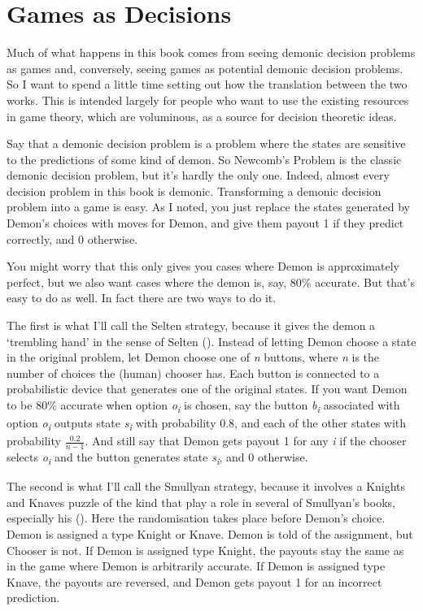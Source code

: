 \documentclass[
  12pt,
  letterpaper,
  DIV=11,
  numbers=noendperiod]{scrreprt}
\begin{document}
\cleardoublepage
{}
{}
\appendix

\chapter{Games as Decisions}\label{sec-gad}

Much of what happens in this book comes from seeing demonic decision
problems as games and, conversely, seeing games as potential demonic
decision problems. So I want to spend a little time setting out how the
translation between the two works. This is intended largely for people
who want to use the existing resources in game theory, which are
voluminous, as a source for decision theoretic ideas.

Say that a demonic decision problem is a problem where the states are
sensitive to the predictions of some kind of demon. So Newcomb's Problem
is the classic demonic decision problem, but it's hardly the only one.
Indeed, almost every decision problem in this book is demonic.
Transforming a demonic decision problem into a game is easy. As I noted,
you just replace the states generated by Demon's choices with moves for
Demon, and give them payout 1 if they predict correctly, and 0
otherwise.

You might worry that this only gives you cases where Demon is
approximately perfect, but we also want cases where the demon is, say,
80\% accurate. But that's easy to do as well. In fact there are two ways
to do it.

The first is what I'll call the Selten strategy, because it gives the
demon a `trembling hand' in the sense of Selten
(). Instead of letting Demon choose a
state in the original problem, let Demon choose one of \emph{n} buttons,
where \emph{n} is the number of choices the (human) chooser has. Each
button is connected to a probabilistic device that generates one of the
original states. If you want Demon to be 80\% accurate when option
\emph{o\textsubscript{i}} is chosen, say the button
\emph{b\textsubscript{i}} associated with option
\emph{o\textsubscript{i}} outputs state \emph{s\textsubscript{i}} with
probability 0.8, and each of the other states with probability
\(\frac{0.2}{n - 1}\). And still say that Demon gets payout 1 for any
\emph{i} if the chooser selects \emph{o\textsubscript{i}} and the button
generates state \emph{s\textsubscript{i}}, and 0 otherwise.

The second is what I'll call the Smullyan strategy, because it involves
a Knights and Knaves puzzle of the kind that play a role in several of
Smullyan's books, especially his ().
Here the randomisation takes place before Demon's choice. Demon is
assigned a type Knight or Knave. Demon is told of the assignment, but
Chooser is not. If Demon is assigned type Knight, the payouts stay the
same as in the game where Demon is arbitrarily accurate. If Demon is
assigned type Knave, the payouts are reversed, and Demon gets payout 1
for an incorrect prediction.
\end{document}
